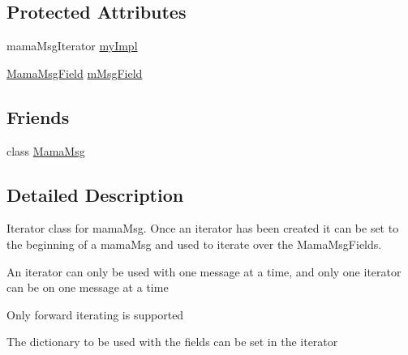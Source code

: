 \subsection*{Protected Attributes}
\begin{DoxyCompactItemize}
\item 
mamaMsgIterator \hyperlink{classWombat_1_1MamaMsgIterator_a26a128f59ba936caffd72fc477059b86}{myImpl}
\item 
\hyperlink{classWombat_1_1MamaMsgField}{MamaMsgField} \hyperlink{classWombat_1_1MamaMsgIterator_a9bf4ef87a3bc03de3850fb884ecbf74f}{mMsgField}
\end{DoxyCompactItemize}
\subsection*{Friends}
\begin{DoxyCompactItemize}
\item 
class \hyperlink{classWombat_1_1MamaMsgIterator_a627b5ab9311b2275c94c0ee886300bd8}{MamaMsg}
\end{DoxyCompactItemize}


\subsection{Detailed Description}
Iterator class for mamaMsg. Once an iterator has been created it can be set to the beginning of a mamaMsg and used to iterate over the MamaMsgFields.

An iterator can only be used with one message at a time, and only one iterator can be on one message at a time

Only forward iterating is supported

The dictionary to be used with the fields can be set in the iterator 


